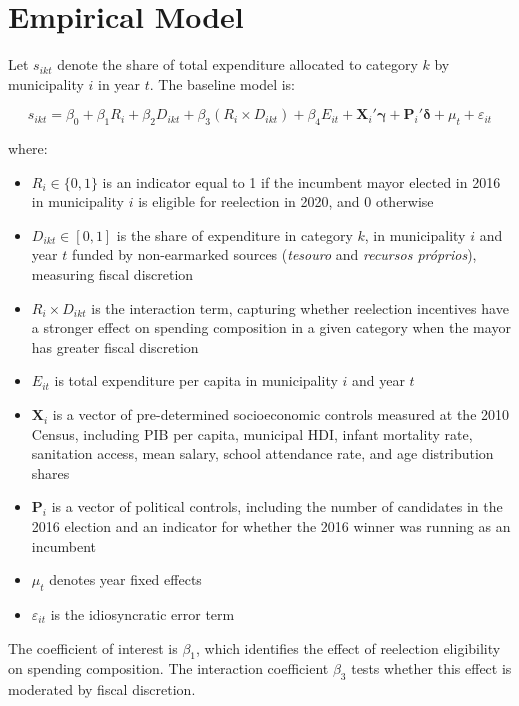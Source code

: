 \documentclass{article}
\begin{document}
\section*{Empirical Model}

Let $s_{ikt}$ denote the share of total expenditure allocated to category $k$ by municipality $i$ in year $t$. The baseline model is:

\begin{equation}
    s_{ikt} = \beta_0 
            + \beta_1 R_i 
            + \beta_2 D_{ikt} 
            + \beta_3 (R_i \times D_{ikt}) 
            + \beta_4 E_{it} 
            + \mathbf{X}_i'\boldsymbol{\gamma} 
            + \mathbf{P}_i'\boldsymbol{\delta} 
            + \mu_t 
            + \varepsilon_{it}
\end{equation}

\noindent where:

\begin{itemize}
    \item $R_i \in \{0,1\}$ is an indicator equal to 1 if the incumbent mayor elected in 2016 in municipality $i$ is eligible for reelection in 2020, and 0 otherwise
    \item $D_{ikt} \in [0,1]$ is the share of expenditure in category $k$, in municipality $i$ and year $t$ funded by non-earmarked sources (\textit{tesouro} and \textit{recursos próprios}), measuring fiscal discretion
    \item $R_i \times D_{ikt}$ is the interaction term, capturing whether reelection incentives have a stronger effect on spending composition in a given category when the mayor has greater fiscal discretion
    \item $E_{it}$ is total expenditure per capita in municipality $i$ and year $t$
    \item $\mathbf{X}_i$ is a vector of pre-determined socioeconomic controls measured at the 2010 Census, including PIB per capita, municipal HDI, infant mortality rate, sanitation access, mean salary, school attendance rate, and age distribution shares
    \item $\mathbf{P}_i$ is a vector of political controls, including the number of candidates in the 2016 election and an indicator for whether the 2016 winner was running as an incumbent
    \item $\mu_t$ denotes year fixed effects
    \item $\varepsilon_{it}$ is the idiosyncratic error term
\end{itemize}

\noindent The coefficient of interest is $\beta_1$, which identifies the effect of reelection eligibility on spending composition. The interaction coefficient $\beta_3$ tests whether this effect is moderated by fiscal discretion.
\end{document}
